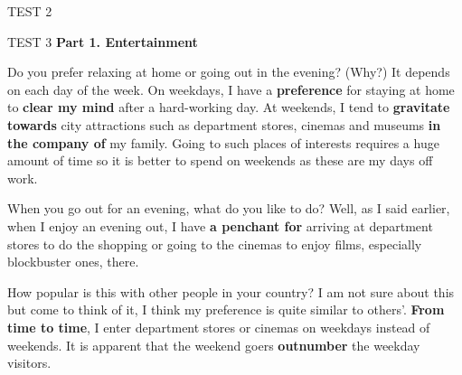 \begin{glossarymc}[Cambridge 5]
\begin{test}{TEST 2}
\begin{VocabHighlights}
    \end{VocabHighlights}

    \end{test}

    \begin{test}{TEST 3}
    \noindent
    \textbf{Part 1. Entertainment}

    \begin{qa}{Do you prefer relaxing at home or going out in the evening? (Why?)}
    It depends on each day of the week. On weekdays, I have a \textbf{preference} for staying at home to \textbf{clear my mind} after a hard-working day. At weekends, I tend to \textbf{gravitate towards} city attractions such as department stores, cinemas and museums \textbf{in the company of} my family. Going to such places of interests requires a huge amount of time so it is better to spend on weekends as these are my days off work.
    \end{qa}

    \begin{qa}{When you go out for an evening, what do you like to do?}
    Well, as I said earlier, when I enjoy an evening out, I have \textbf{a penchant for} arriving at department stores to do the shopping or going to the cinemas to enjoy films, especially blockbuster ones, there.
    \end{qa}

    \begin{qa}{How popular is this with other people in your country?}
    I am not sure about this but come to think of it, I think my preference is quite similar to others'. \textbf{From time to time}, I enter department stores or cinemas on weekdays instead of weekends. It is apparent that the weekend goers \textbf{outnumber} the weekday visitors.
    \end{qa}


\end{test}
\end{glossarymc}
